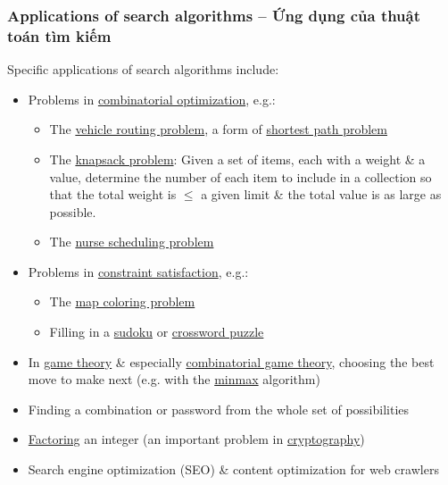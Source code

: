 \documentclass{article}
\begin{document}
\subsubsection{Applications of search algorithms -- Ứng dụng của thuật toán tìm kiếm}
Specific applications of search algorithms include:
\begin{itemize}
	\item Problems in \href{https://en.wikipedia.org/wiki/Combinatorial_optimization}{combinatorial optimization}, e.g.:
	\begin{itemize}
		\item The \href{https://en.wikipedia.org/wiki/Vehicle_routing_problem}{vehicle routing problem}, a form of \href{https://en.wikipedia.org/wiki/Shortest_path_problem}{shortest path problem}
		\item The \href{https://en.wikipedia.org/wiki/Knapsack_problem}{knapsack problem}: Given a set of items, each with a weight \& a value, determine the number of each item to include in a collection so that the total weight is $\le$ a given limit \& the total value is as large as possible.
		\item The \href{https://en.wikipedia.org/wiki/Nurse_scheduling_problem}{nurse scheduling problem}
	\end{itemize}
	\item Problems in \href{https://en.wikipedia.org/wiki/Constraint_satisfaction}{constraint satisfaction}, e.g.:
	\begin{itemize}
		\item The \href{https://en.wikipedia.org/wiki/Map_coloring_problem}{map coloring problem}
		\item Filling in a \href{https://en.wikipedia.org/wiki/Sudoku}{sudoku} or \href{https://en.wikipedia.org/wiki/Crossword_puzzle}{crossword puzzle}
	\end{itemize}
	\item In \href{https://en.wikipedia.org/wiki/Game_theory}{game theory} \& especially \href{https://en.wikipedia.org/wiki/Combinatorial_game_theory}{combinatorial game theory}, choosing the best move to make next (e.g. with the \href{https://en.wikipedia.org/wiki/Minmax}{minmax} algorithm)
	\item Finding a combination or password from the whole set of possibilities
	\item \href{https://en.wikipedia.org/wiki/Factorization}{Factoring} an integer (an important problem in \href{https://en.wikipedia.org/wiki/Cryptography}{cryptography})
	\item Search engine optimization (SEO) \& content optimization for web crawlers

\end{itemize}
\end{document}
